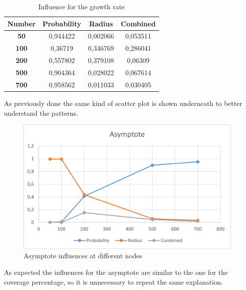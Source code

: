 \begin{table}[H]
\centering
\begin{tabular}{|c|c|c|c|}
\hline
\textbf{Number} & \textbf{Probability} & \textbf{Radius} & \textbf{Combined} \\ \hline
\textbf{50} & 0,944422 & 0,002066 & 0,053511 \\ \hline
\textbf{100} & 0,36719 & 0,346769 & 0,286041 \\ \hline
\textbf{200} & 0,557802 & 0,379108 & 0,06309 \\ \hline
\textbf{500} & 0,904364 & 0,028022 & 0,067614 \\ \hline
\textbf{700} & 0,958562 & 0,011033 & 0,030405 \\ \hline
\end{tabular}
\caption{Influence for the growth rate}
\end{table}

As previously done the same kind of scatter plot is shown underneath to better understand the patterns.

\begin{figure}[H]\label{pic:AsymptoteNodes}
\centering
    \includegraphics[width= 1\textwidth]{./images/AsymptoteWithNodes.png}
    \caption{Asymptote influences at different nodes}

\end{figure}

As expected the influences for the asymptote are similar to the one for the coverage percentage, so it is unnecessary to repeat the same explanation.

